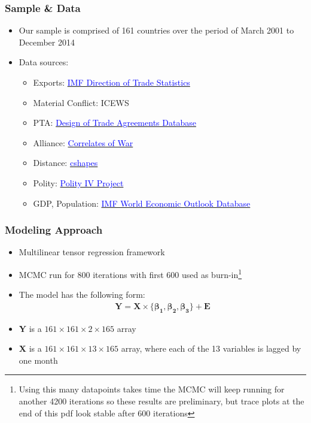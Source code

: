 \documentclass[10pt, compress]{beamer}
\begin{document}
\frame
{
  \frametitle{Sample \& Data}
  \begin{itemize}
  \item  Our sample is comprised of 161 countries over the period of March 2001 to December 2014
  \item Data sources:
  \begin{itemize}
    \item Exports: \href{http://data.imf.org/?sk=8aa6eb7c-598b-4d3b-82f4-adab95d23145&dsId=DS_1414779485682}{\textcolor{blue}{IMF Direction of Trade Statistics}}
    \item Material Conflict: ICEWS
    \item PTA: \href{http://www.designoftradeagreements.org/}{\textcolor{blue}{Design of Trade Agreements Database}}
    \item Alliance: \href{http://www.correlatesofwar.org/news/alliances-data-set-v4-1-available-1}{\textcolor{blue}{Correlates of War}}
    \item Distance: \href{http://nils.weidmann.ws/projects/cshapes}{\textcolor{blue}{cshapes}}
    \item Polity: \href{http://www.systemicpeace.org/polity/polity4.htm}{\textcolor{blue}{Polity IV Project}}
    \item GDP, Population: \href{https://www.imf.org/external/pubs/ft/weo/2014/02/weodata/index.aspx}{\textcolor{blue}{IMF World Economic Outlook Database}}
  \end{itemize}
  \end{itemize}    
} 

\frame
{
  \frametitle{Modeling Approach}
  \begin{itemize}
  \item Multilinear tensor regression framework
  \item MCMC run for 800 iterations with first 600 used as burn-in\footnote{Using this many datapoints takes time the MCMC will keep running for another 4200 iterations so these results are preliminary, but trace plots at the end of this pdf look stable after 600 iterations}
  \item The model has the following form:
  \begin{align*}
  \textbf{Y} = \textbf{X} \times \{\boldsymbol{\beta_{1}}, \boldsymbol{\beta_{2}}, \boldsymbol{\beta_{3}} \} + \textbf{E}
  \end{align*}
  \item \textbf{Y} is a $161 \times 161 \times 2 \times 165$ array
  \item \textbf{X} is a $161 \times 161 \times 13 \times 165$ array, where each of the 13 variables is lagged by one month
  \end{itemize}    
} 
\end{document}
